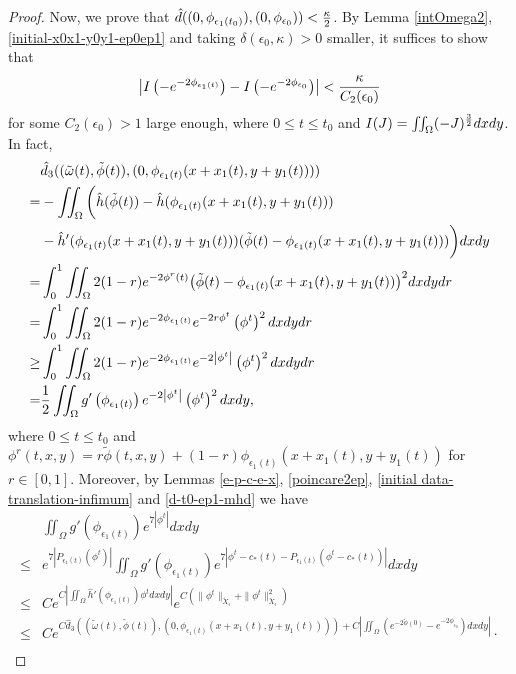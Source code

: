 \documentclass[1 [leqno, 11pt]{amsart}
\numberwithin{equation}{section}
\let\ep=\epsilon
\begin{document}
\begin{CJK*}{GBK}{song}
\begin{proof}
Now, we prove that $\hat d((0,\phi_{\ep_1(t_0)}),(0,\phi_{\ep_0}))<{\kappa\over 2}$.   By Lemma \ref{intOmega2}, \eqref{initial-x0x1-y0y1-ep0ep1} and taking $\delta(\ep_0,\kappa)>0$ smaller, it suffices to show that
\begin{align}\label{I-omegaep1t0-omegaep0-mhd}
\left|I\left(-e^{-2\phi_{\ep_1(t)}}\right)-I\left(-e^{-2\phi_{\ep_0}}\right)\right|<{\kappa\over C_2(\ep_0)}
\end{align}
for  some $C_2(\ep_0)>1$ large enough, where $0\leq t\leq t_0$ and $I(J)=\iint_{\Omega}(-J)^{3\over2}dxdy$. In fact,
\begin{align}\nonumber
&\hat d_3((\tilde \omega(t),\tilde \phi(t)),( 0, \phi_{\ep_1(t)}(x+x_1(t),y+y_1(t))))\\\nonumber
=&-\iint_{\Omega}\bigg(\hat h(\tilde \phi(t))-\hat h(\phi_{\ep_1(t)}(x+x_1(t),y+y_1(t)))\\\nonumber
&-\hat h'(\phi_{\ep_1(t)}(x+x_1(t),y+y_1(t)))
(\tilde \phi(t)-\phi_{\ep_1(t)}(x+x_1(t),y+y_1(t)))\bigg)dxdy\\\nonumber
=&\int_0^1\iint_\Omega2(1-r)e^{-2\phi^r(t)}\big(\tilde \phi(t)-\phi_{\ep_1(t)}(x+x_1(t),y+y_1(t))\big)^2dxdydr\\\nonumber
=&\int_0^1\iint_{\Omega}2(1-r)e^{-2\phi_{\ep_1(t)}}e^{-2r\phi^t}\left(\phi^t\right)^2dxdydr\\\nonumber
\geq&\int_0^1\iint_{\Omega}2(1-r)e^{-2\phi_{\ep_1(t)}}e^{-2\left|\phi^t\right|}\left(\phi^t\right)^2dxdydr\\\label{d1 estimates-mhd}
=&{1\over2}\iint_{\Omega}g'\left(\phi_{\ep_1(t)}\right)e^{-2\left|\phi^t\right|}\left(\phi^t\right)^2dxdy,
\end{align}
where $0\leq t\leq t_0$ and $\phi^r(t,x,y)=r\tilde \phi(t,x,y)+(1-r)\phi_{\ep_1(t)}(x+x_1(t),y+y_1(t))$ for $r\in[0,1]$.
Moreover, by Lemmas \ref{e-p-c-e-x}, \ref{poincare2ep}, \eqref{initial data-translation-infimum} and \eqref{d-t0-ep1-mhd} we have
\begin{align*}
&\iint_{\Omega}g'\left(\phi_{\ep_1(t)}\right)e^{7\left|\phi^t\right|}dxdy\\
\leq& e^{7\left|P_{\ep_1(t)}(\phi^t)\right|}\iint_{\Omega}g'\left(\phi_{\ep_1(t)}\right)e^{7\left|\phi^t-c_*(t)-P_{\ep_1(t)}(\phi^t-c_*(t))\right|}dxdy\\
\leq&Ce^{C|\iint_\Omega\hat h'(\phi_{\ep_1(t)})\phi^tdxdy|} e^{C\left(\|\phi^t\|_{\tilde{X}_\ep}+\|\phi^t\|_{\tilde{X}_\ep}^2\right)}\\
\leq &
Ce^{C\hat d_3((\tilde \omega(t),\tilde \phi(t)),( 0, \phi_{\ep_1(t)}(x+x_1(t),y+y_1(t))))+C\left|\iint_{\Omega}(e^{-2\tilde \phi(0)}-e^{-2\phi_{\ep_0}})dxdy\right|}\cdot\\

\end{align*}
\end{proof}
\end{CJK*}
\end{document}
